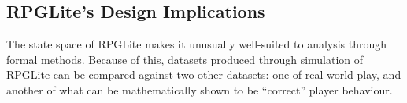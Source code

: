 \subsection{RPGLite's Design Implications}
\label{rpglite_game_states}

The state space of RPGLite makes it unusually well-suited to analysis through
formal methods.  Because of this, datasets produced through simulation of
RPGLite can be compared against two other datasets: one of real-world play, and
another of what can be mathematically shown to be ``correct'' player behaviour.


